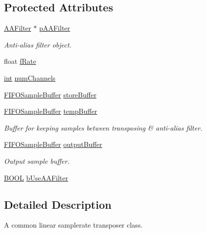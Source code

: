 \subsection*{Protected Attributes}
\begin{DoxyCompactItemize}
\item 
\hyperlink{classsoundtouch_1_1_a_a_filter}{A\+A\+Filter} $\ast$ \hyperlink{classsoundtouch_1_1_rate_transposer_ac32a7256b536fbc54d326642265f746b}{p\+A\+A\+Filter}
\begin{DoxyCompactList}\small\item\em Anti-\/alias filter object. \end{DoxyCompactList}\item 
float \hyperlink{classsoundtouch_1_1_rate_transposer_a2b5aee8fbcdae3837d24f35be20e8480}{f\+Rate}
\item 
\hyperlink{xmltok_8h_a5a0d4a5641ce434f1d23533f2b2e6653}{int} \hyperlink{classsoundtouch_1_1_rate_transposer_a0e63f2c449394d144c19cee498489379}{num\+Channels}
\item 
\hyperlink{classsoundtouch_1_1_f_i_f_o_sample_buffer}{F\+I\+F\+O\+Sample\+Buffer} \hyperlink{classsoundtouch_1_1_rate_transposer_aeff1b8c025f1c3397cad4d59648997cc}{store\+Buffer}
\item 
\hyperlink{classsoundtouch_1_1_f_i_f_o_sample_buffer}{F\+I\+F\+O\+Sample\+Buffer} \hyperlink{classsoundtouch_1_1_rate_transposer_a898c0c2166828bea24da8a873ecd35e0}{temp\+Buffer}
\begin{DoxyCompactList}\small\item\em Buffer for keeping samples between transposing \& anti-\/alias filter. \end{DoxyCompactList}\item 
\hyperlink{classsoundtouch_1_1_f_i_f_o_sample_buffer}{F\+I\+F\+O\+Sample\+Buffer} \hyperlink{classsoundtouch_1_1_rate_transposer_a13e97123dd8921c3ac036893aac2df30}{output\+Buffer}
\begin{DoxyCompactList}\small\item\em Output sample buffer. \end{DoxyCompactList}\item 
\hyperlink{nfilterkit_8h_a3be13892ae7076009afcf121347dd319}{B\+O\+OL} \hyperlink{classsoundtouch_1_1_rate_transposer_a6e05f37aa568e826701f62446991b77c}{b\+Use\+A\+A\+Filter}
\end{DoxyCompactItemize}


\subsection{Detailed Description}
A common linear samplerate transposer class.

